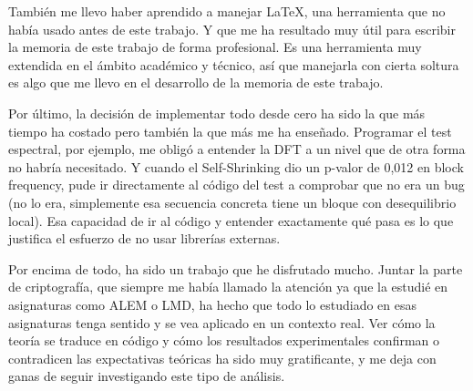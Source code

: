 También me llevo haber aprendido a manejar \LaTeX{}, una herramienta que no había usado antes de este trabajo. Y que me ha resultado muy útil para escribir la memoria de este trabajo de forma profesional.
Es una herramienta muy extendida en el ámbito académico y técnico, así que manejarla con cierta soltura es algo que me llevo en el desarrollo de la memoria de este trabajo.

Por último, la decisión de implementar todo desde cero ha sido la que más tiempo ha costado pero también la que más me ha enseñado.
Programar el test espectral, por ejemplo, me obligó a entender la DFT a un nivel que de otra forma no habría necesitado.
Y cuando el Self-Shrinking dio un p-valor de 0,012 en block frequency, pude ir directamente al código del test a comprobar que no era un bug
(no lo era, simplemente esa secuencia concreta tiene un bloque con desequilibrio local). Esa capacidad de ir al código y entender exactamente qué pasa
es lo que justifica el esfuerzo de no usar librerías externas.

Por encima de todo, ha sido un trabajo que he disfrutado mucho. Juntar la parte de criptografía, que siempre me había llamado la atención ya que la estudié en asignaturas como ALEM o LMD,
ha hecho que todo lo estudiado en esas asignaturas tenga sentido y se vea aplicado en un contexto real. Ver cómo la teoría se traduce en código y
cómo los resultados experimentales confirman o contradicen las expectativas teóricas ha sido muy gratificante, y me deja con ganas de seguir investigando este tipo de análisis.
